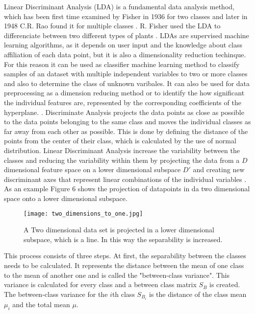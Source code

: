 \documentclass[../masterarbeit.tex]{subfiles}
\begin{document}
Linear Discriminant Analysis (LDA) is a fundamental data analysis method, which has been first time examined by Fisher in 1936 for two classes and later in 1948 C.R. Rao found it for multiple classes \textcite[]{DEMIR2005421} \textcite[]{analyticsvidhyaLDA:2021} \textcite[]{Xanthopoulos2013}. R. Fisher used the LDA to differenciate between two different types of plants \textcite[]{Xanthopoulos2013}. 
LDAs are supervised machine learning algorithms, as it depends on user input and the knowledge about class affiliation of each data point, but it is also a dimensionality reduction techinque. For this reason it can be used as classifier machine learning method to classify samples of an dataset with multiple independent variables to two or more classes and also to determine the class of unknown varibales. It can also be used for data preprocessing as a dimension reducing method or to identify the how significant the individual features are, represented by the corresponding coefficients of the hyperplane.  \autocite[]{MENDLEIN2013646} \autocite[]{Bahram:2019} \autocite[]{Xanthopoulos2013} \autocite[]{SUBASI202091} \autocite[]{analyticsvidhyaLDA:2021}. 
Discriminate Analysis projects the data points as close as possible to the data points belonging to the same class and moves the individual classes as far away from each other as possible. This is done by defining the distance of the points from the center of their class, which is calculated by the use of normal distribution. \autocite[]{MENDLEIN2013646} \autocite[]{Bahram:2019} \autocite[]{SUBASI202091} \autocite[]{Xanthopoulos2013}
Linear Discriminant Analysis increase the variability between the classes and reducing the variability within them by projecting the data from a \(D\) dimensional feature space on a lower dimensional subspace \(D'\) and creating new discriminant axes that represent linear combinations of the individual variables \textcite[]{analyticsvidhyaLDA:2021} \textcite[]{DEMIR2005421}. As an example Figure 6 shows  the projection of datapoints in da two dimensional space onto a lower dimensional subspace.\\
\begin{figure}[h]
    \centering
    \texttt{[image: two\_dimensions\_to\_one.jpg]}
    \caption{A Two dimensional data set is projected in a lower dimensional subspace, which is a line. In this way the separability is increased.}
\end{figure} 
This process consists of three steps. At first, the separability between the classes needs to be calculated. It represents the distance between the mean of one class to the mean of another one and is called the "between-class variance". This variance is calculated for every class and a between class matrix \(S_B\) is created. The between-class variance for the \(i\)th class \(S_{B_i}\) is the distance of the class mean \(\mu_i\) and the total mean \(\mu\). \autocite[]{Tharwat:2017} \\
\end{document}
